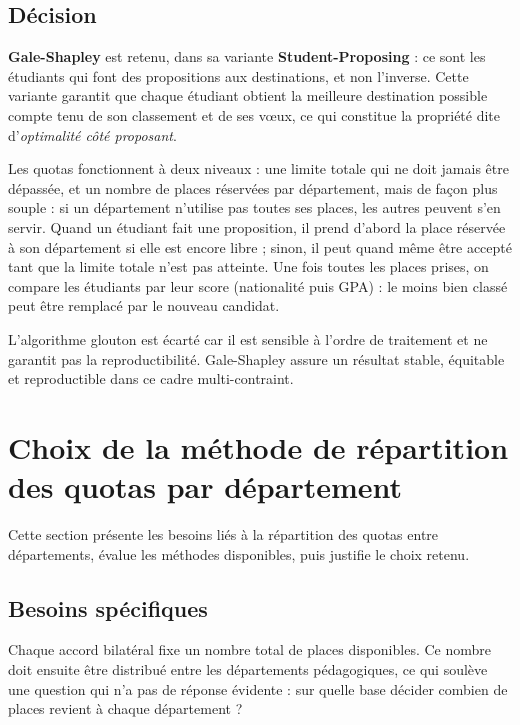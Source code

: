 \subsection{Décision}

\textbf{Gale-Shapley} est retenu, dans sa variante \textbf{Student-Proposing} :
ce sont les étudiants qui font des propositions aux destinations, et non
l'inverse. Cette variante garantit que chaque étudiant obtient la meilleure
destination possible compte tenu de son classement et de ses vœux, ce qui
constitue la propriété dite d'\textit{optimalité côté proposant}.

Les quotas fonctionnent à deux niveaux : une limite totale qui ne doit
jamais être dépassée, et un nombre de places réservées par département,
mais de façon plus souple : si un département n'utilise pas toutes ses
places, les autres peuvent s'en servir. Quand un étudiant fait une
proposition, il prend d'abord la place réservée à son département si
elle est encore libre ; sinon, il peut quand même être accepté tant que
la limite totale n'est pas atteinte. Une fois toutes les places prises,
on compare les étudiants par leur score (nationalité puis GPA) : le
moins bien classé peut être remplacé par le nouveau candidat.

L'algorithme glouton est écarté car il est sensible à l'ordre de traitement
et ne garantit pas la reproductibilité. Gale-Shapley assure un résultat
stable, équitable et reproductible dans ce cadre multi-contraint.


\section{Choix de la méthode de répartition des quotas par département}

Cette section présente les besoins liés à la répartition des quotas entre
départements, évalue les méthodes disponibles, puis justifie le choix retenu.

\subsection{Besoins spécifiques}

Chaque accord bilatéral fixe un nombre total de places disponibles. Ce nombre
doit ensuite être distribué entre les départements pédagogiques, ce qui soulève
une question qui n'a pas de réponse évidente : sur quelle base décider combien
de places revient à chaque département ?

